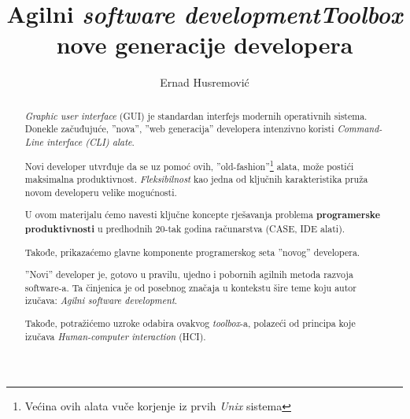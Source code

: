 \documentclass[times, utf8, seminar]{fit}
\begin{document}
\setlength{\parindent}{0pt}


\title{Agilni \emph{software development}\newline \emph{Toolbox} nove generacije developera}

\author{Ernad Husremović}

\maketitle

\tableofcontents

\newpage

\begin{abstract}

\emph{Graphic user interface} (GUI) je standardan interfejs modernih operativnih sistema. Donekle začuđujuće, ''nova'', ''web generacija'' developera intenzivno koristi \emph{Command-Line interface (CLI) alate}. 

Novi developer utvrđuje da se uz pomoć ovih, ''old-fashion''\footnote{Većina ovih alata vuče korjenje iz prvih \emph{Unix} sistema} alata, može postići maksimalna produktivnost. \emph{Fleksibilnost} kao jedna od ključnih karakteristika pruža novom developeru velike mogućnosti.
 
U ovom materijalu ćemo navesti ključne koncepte rješavanja problema \textbf{programerske produktivnosti} u predhodnih 20-tak godina računarstva (CASE, IDE alati). 

Takođe, prikazaćemo glavne komponente programerskog seta ''novog'' developera. 

''Novi'' developer je, gotovo u pravilu,  ujedno i pobornih agilnih metoda razvoja software-a. Ta činjenica je od posebnog značaja u kontekstu šire teme koju autor izučava: \emph{Agilni software development}.

Takođe, potražićemo uzroke odabira ovakvog \emph{toolbox}-a, polazeći od principa koje izučava \emph{Human-computer interaction} (HCI). 

\end{abstract}
\end{document}
